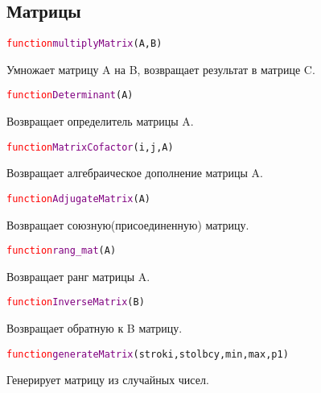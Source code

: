 		\subsection{Матрицы}
			\begin{alltt} 	
				\textcolor{Red}{function} \textcolor{Purple}{multiplyMatrix}(A,B)
			\end{alltt}
		Умножает матрицу A на B, возвращает результат в матрице C.
			\begin{alltt} 	
				\textcolor{Red}{function} \textcolor{Purple}{Determinant}(A)
			\end{alltt}
		Возвращает определитель матрицы A.
			\begin{alltt} 
				\textcolor{Red}{function} \textcolor{Purple}{MatrixCofactor}(i,j,A)
			\end{alltt}
		Возвращает алгебраическое дополнение матрицы A.
			\begin{alltt} 
				\textcolor{Red}{function} \textcolor{Purple}{AdjugateMatrix}(A)
			\end{alltt}
		Возвращает союзную(присоединенную) матрицу.
			\begin{alltt} 	
				\textcolor{Red}{function} \textcolor{Purple}{rang_mat}(А)
			\end{alltt}
		Возвращает ранг матрицы A.
			\begin{alltt} 	
				\textcolor{Red}{function} \textcolor{Purple}{InverseMatrix}(B)
			\end{alltt}
		Возвращает обратную  к B матрицу.
			\begin{alltt} 	
				\textcolor{Red}{function} \textcolor{Purple}{generateMatrix}(stroki,stolbcy,min,max,p1)
			\end{alltt}
		Генерирует матрицу из случайных чисел.
